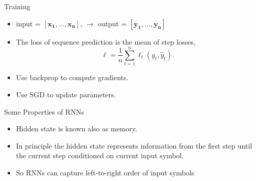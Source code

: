 \begin{frame}{Training}
    \begin{itemize}
        \item input = $[\bm{x_1},..., \bm{x_n}]$, $\longrightarrow$ output = $[\bm{y_1},..., \bm{y_n}]$
        \item The loss of sequence prediction is the mean of step losses, 
        \begin{equation*}
            \ell = \frac{1}{n} \sum_{t=1}^n \ell_t(y_t, \hat{y}_t).
        \end{equation*}
        \item Use backprop to compute gradients.
        \item Use SGD to update parameters. 
    \end{itemize}
\end{frame}
\begin{frame}{Some Properties of RNNs}
    \begin{itemize}
        \item Hidden state is known also as memory.
        \item In principle the hidden state represents information from the first step until the current step conditioned on current input symbol. 
        \item So RNNs can capture left-to-right order of input symbols
    \end{itemize}
\end{frame}

